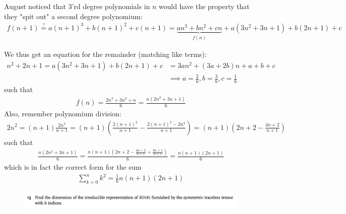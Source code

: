 \documentclass[a4paper]{article}
\theoremstyle{definition} %
\theoremstyle{plain} %
\theoremstyle{remark} %
\begin{document}
    August noticed that 3'rd degree polynomials in \(n\) would have the property that they "spit out" a second degree polynomium: \begin{align*}
        f(n + 1) \stackrel{?}{=} a(n + 1)^3 + b(n + 1)^2 + c(n + 1) = \underbrace{an^3 + bn^{2} + cn}_{f(n)} + a(3n^{2} + 3n + 1) + b(2n + 1) + c
    \end{align*}

    We thus get an equation for the remainder (matching like terms): \begin{align*}
        n^{2} + 2n + 1 = a(3n^{2} + 3n + 1) + b(2n + 1) + c &= 3an ^{2} + (3a + 2b)n + a + b + c\\
        &\implies a = \frac{2}{6}, b = \frac{3}{6}, c = \frac{1}{6}
    \end{align*}
    such that \begin{align*}
        f(n) = \frac{2n^3 + 3n^2 + n}{6} = \frac{n(2n^2 + 3n + 1)}{6}
    \end{align*}
    Also, remember polynomium division: \begin{align*}
        2n^{2}= (n+1) \frac{2n^{2}}{n + 1} = (n + 1) \left(\frac{2(n + 1)^{2} }{n + 1} - \frac{2(n + 1)^{2} - 2n^{2} }{n + 1}\right) = (n + 1) \left( 2n + 2 - \frac{4n + 2}{n + 1} \right)  
    \end{align*}
    such that \begin{align*}
        \frac{n(2n^2 + 3n + 1)}{6} = \frac{n(n + 1) \left( 2n + 2 - \frac{4n + 2}{n + 1} + \frac{3n + 1}{n + 1} \right)  }{6} = \frac{n (n + 1) \left( 2n + 1\right) }{6}
    \end{align*}
    which is in fact the correct form for the sum \begin{align*}
        \sum_{k = 0}^n k^{2} = \frac{1}{6}n(n+1)(2n + 1) 
    \end{align*}

    \begin{figure}[H]
        \centering
        \includegraphics[width=1\textwidth]{figs/IV.1.13.png}
    \end{figure}
\end{document}
